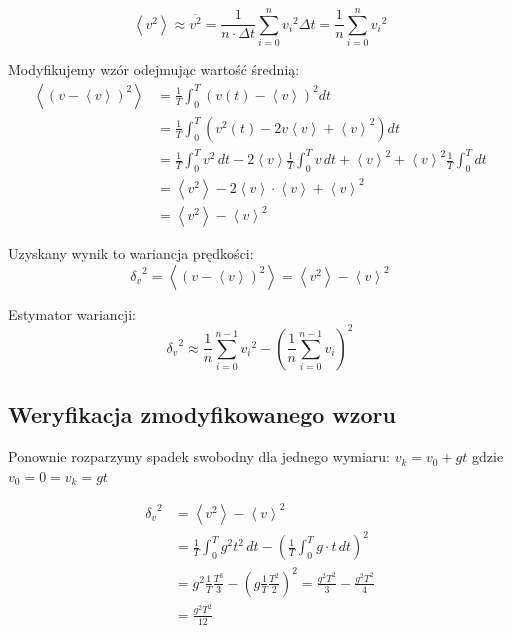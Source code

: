 \documentclass[12pt, letterpaper]{report}
\begin{document}
    \begin{equation}
        \left< v^{2} \right>  \approx  \overline{v^2} = \frac{1}{n \cdot \Delta t} \sum_{i = 0}^{n} {v_i}^2 \Delta t
        = \frac{1}{n} \sum_{i = 0}^n {v_i}^2
    \end{equation}

    Modyfikujemy wzór odejmując wartość średnią:
    \begin{align*}
        \left< \left( v - \left< v \right> \right)^2 \right>  &=  
        \frac{1}{T} \int_{0}^{T} \left( v(t) - \left< v \right> \right)^2 dt  \\
        &= \frac{1}{T} \int_{0}^{T} \left( v^2(t) - 2v \left< v \right> + \left< v \right>^2 \right) dt  \\
        &= \frac{1}{T} \int_{0}^{T} v^2 \, dt - 2 \left< v \right> \frac{1}{T} \int_{0}^{T} v \, dt + \left< v \right>^2 
        + \left< v \right>^2 \frac{1}{T} \int_{0}^{T} dt \\
        &= \left< v^2 \right> - 2 \left< v \right> \cdot \left< v \right> + \left< v \right>^2 \\
        &= \left< v^2 \right> - \left< v \right>^2
    \end{align*}

    Uzyskany wynik to wariancja prędkości:
    \begin{equation}
        {\delta_v}^2  =  \left< \left( v - \left< v \right> \right)^2 \right>  =  \left< v^2 \right> - \left< v \right>^2
    \end{equation}

    Estymator wariancji:
    \begin{equation}
        {\delta_v}^2  \approx  \frac{1}{n} \sum_{i = 0}^{n - 1} {v_i}^2 - \left( \frac{1}{n} \sum_{i = 0}^{n - 1} {v_i} \right)^2
    \end{equation}

    \subsection{Weryfikacja zmodyfikowanego wzoru}
    Ponownie rozparzymy spadek swobodny dla jednego wymiaru: $v_k = v_0 + gt$ gdzie $v_0 = 0 = v_k = gt$

    \begin{align*}
        {\delta_v}^2  &=
        \left< v^2 \right> - \left< v \right>^2 \\ 
        &=  \frac{1}{T} \int_{0}^{T} g^2 t^2 \, dt  -  \left( \frac{1}{T} \int_{0}^{T} g \cdot t \, dt \right)^2  \\
        &=  g^2 \frac{1}{T} \frac{T^3}{3}  -  \left( g \frac{1}{T} \frac{T^2}{2} \right)^2  = \frac{g^2 T^2}{3}  -  \frac{g^2 T^2}{4} \\
        &=  \frac{g^2 T^2}{12}
    \end{align*}
\end{document}
